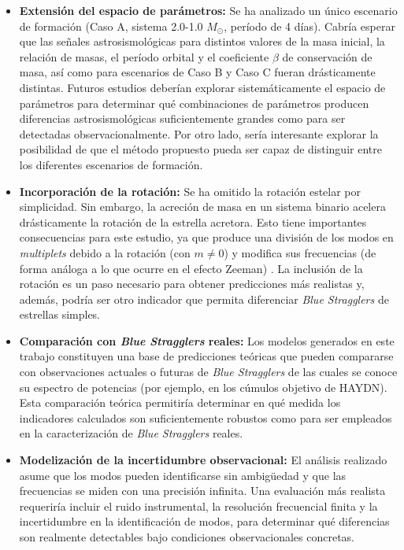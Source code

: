 \begin{itemize}
  \item \textbf{Extensión del espacio de parámetros:} Se ha analizado un único escenario de formación (Caso A, sistema 2.0-1.0 $M_\odot$, período de 4 días). Cabría esperar que las señales astrosismológicas para distintos valores de la masa inicial, la relación de masas, el período orbital y el coeficiente $\beta$ de conservación de masa, así como para escenarios de Caso B y Caso C fueran drásticamente distintas. Futuros estudios deberían explorar sistemáticamente el espacio de parámetros para determinar qué combinaciones de parámetros producen diferencias astrosismológicas suficientemente grandes como para ser detectadas observacionalmente. Por otro lado, sería interesante explorar la posibilidad de que el método propuesto pueda ser capaz de distinguir entre los diferentes escenarios de formación.

  \item \textbf{Incorporación de la rotación:} Se ha omitido la rotación estelar por simplicidad. Sin embargo, la acreción de masa en un sistema binario acelera drásticamente la rotación de la estrella acretora. Esto tiene importantes consecuencias para este estudio, ya que produce una división de los modos en \textit{multiplets} debido a la rotación (con $m \neq 0$) y modifica sus frecuencias (de forma análoga a lo que ocurre en el efecto Zeeman) \citep{10.3389/fspas.2022.952296,paxton2015}. La inclusión de la rotación es un paso necesario para obtener predicciones más realistas y, además, podría ser otro indicador que permita diferenciar \textit{Blue Stragglers} de estrellas simples.

  \item \textbf{Comparación con \textit{Blue Stragglers} reales:} Los modelos generados en este trabajo constituyen una base de predicciones teóricas que pueden compararse con observaciones actuales o futuras de \textit{Blue Stragglers} de las cuales se conoce su espectro de potencias (por ejemplo, en los cúmulos objetivo de HAYDN). Esta comparación teórica permitiría determinar en qué medida los indicadores calculados son suficientemente robustos como para ser empleados en la caracterización de \textit{Blue Stragglers} reales.

  \item \textbf{Modelización de la incertidumbre observacional:} El análisis realizado asume que los modos pueden identificarse sin ambigüedad y que las frecuencias se miden con una precisión infinita. Una evaluación más realista requeriría incluir el ruido instrumental, la resolución frecuencial finita y la incertidumbre en la identificación de modos, para determinar qué diferencias son realmente detectables bajo condiciones observacionales concretas.


\end{itemize}
